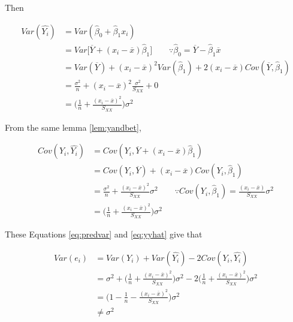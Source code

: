 \documentclass[]{book}
\theoremstyle{definition}
\theoremstyle{definition}
\theoremstyle{definition}
\theoremstyle{remark}
\begin{document}
Then

\begin{equation}
  \begin{split}
    Var(\hat{Y_i}) & = Var(\hat\beta_0 + \hat\beta_1 x_i) \\
    & = Var \bigg[ \overline{Y} + (x_i - \overline{x}) \hat\beta_1 \bigg] \qquad \because \hat\beta_0 = \overline{Y} - \hat\beta_1 \overline{x} \\
    & = Var(\overline{Y}) + (x_i - \overline{x})^2 Var(\hat\beta_1) + 2(x_i - \overline{x}) Cov(\overline{Y}, \hat\beta_1) \\
    & = \frac{\sigma^2}{n} + (x_i - \overline{x})^2\frac{\sigma^2}{S_{XX}} + 0 \\
    & = \bigg( \frac{1}{n} + \frac{(x_i - \overline{x})^2}{S_{XX}} \bigg)\sigma^2
  \end{split}
  \label{eq:predvar}
\end{equation}

From the same lemma \ref{lem:yandbet},

\begin{equation}
  \begin{split}
    Cov(Y_i, \hat{Y_i}) & = Cov(Y_i, \overline{Y} + (x_i - \overline{x}) \hat\beta_1) \\
    & = Cov(Y_i, \overline{Y}) + (x_i - \overline{x}) Cov(Y_i, \hat\beta_1) \\
    & = \frac{\sigma^2}{n} + \frac{(x_i - \overline{x})^2}{S_{XX}}\sigma^2 \qquad \because Cov(Y_i, \hat\beta_1) = \frac{(x_i - \overline{x})}{S_{XX}}\sigma^2 \\
    & = \bigg( \frac{1}{n} + \frac{(x_i - \overline{x})^2}{S_{XX}} \bigg)\sigma^2
  \end{split}
  \label{eq:yyhat}
\end{equation}

These Equations \eqref{eq:predvar} and \eqref{eq:yyhat} give that

\begin{equation}
  \begin{split}
    Var(e_i) & = Var(Y_i) + Var(\hat{Y_i}) -2Cov(Y_i, \hat{Y_i}) \\
    & = \sigma^2 + \bigg( \frac{1}{n} + \frac{(x_i - \overline{x})^2}{S_{XX}} \bigg)\sigma^2 - 2 \bigg( \frac{1}{n} + \frac{(x_i - \overline{x})^2}{S_{XX}} \bigg)\sigma^2 \\
    & = \bigg(1 - \frac{1}{n} - \frac{(x_i - \overline{x})^2}{S_{XX}} \bigg)\sigma^2 \\
    & \neq \sigma^2
  \end{split}
  \label{eq:residvar}
\end{equation}
\end{document}
